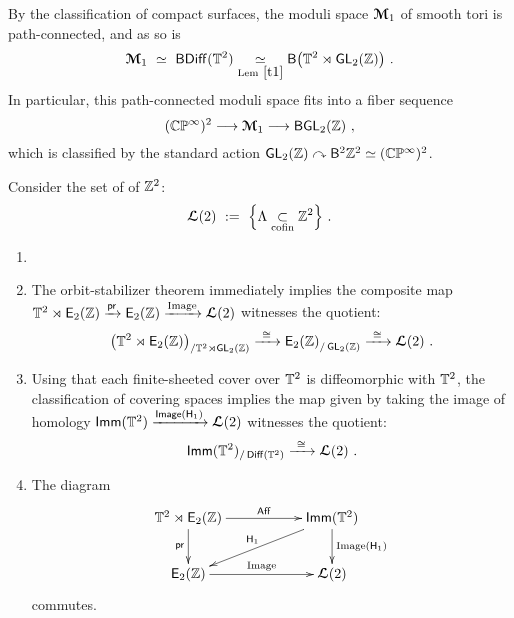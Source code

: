 \begin{remark}
\label{r10}
By the classification of compact surfaces, the moduli space $\boldsymbol{\mathcal M}_1$ of smooth tori is path-connected, and as so is 
\[
\boldsymbol{\mathcal M}_1
~\simeq~
{\sf BDiff}(\mathbb T^2)
\underset{\rm Lem~\ref{t1}}{~\simeq~}
\mathsf B\bigl(
\mathbb T^2 \rtimes \operatorname{\sf GL}_2(\mathbb Z)
\bigr)
~.
\]
In particular, this path-connected moduli space fits into a fiber sequence
\[
(\mathbb C\mathbb P^\infty)^2
\longrightarrow
\boldsymbol{\mathcal M}_1
\longrightarrow
{\sf BGL}_2(\mathbb Z)
~,
\]
which is classified by the standard action $\operatorname{\sf GL}_2(\mathbb Z) \curvearrowright \mathsf B^2 \mathbb Z^2 \simeq (\mathbb C\mathbb P^\infty)^2$.

\end{remark}





Consider the set of  of $\mathbb Z^2$:
\begin{equation*}
\boldsymbol{\mathcal L}(2) 
~:=~
\Bigl\{
\Lambda
\underset{\rm cofin}
\subset
\mathbb Z^2
\Bigr\}
~.
\end{equation*}
\begin{observation} \label{t99}

\begin{enumerate}

\item[~]

\item
The orbit-stabilizer theorem immediately implies the composite map 
$
\mathbb T^2 \rtimes \operatorname{\mathsf E_2(\mathbb Z)}
\xrightarrow{\operatorname{\mathsf{pr}}}
\operatorname{\mathsf E_2(\mathbb Z)}
\xrightarrow{\rm Image} 
\boldsymbol{\mathcal L}(2)
$
witnesses the quotient:
\[
\bigl(
\mathbb T^2 \rtimes \operatorname{\mathsf E_2(\mathbb Z)}
\bigr)_{/\mathbb T^2 \rtimes \operatorname{\sf GL}_2(\mathbb Z)}
\xrightarrow{~\cong~}
\operatorname{\mathsf E_2(\mathbb Z)}_{/\operatorname{\sf GL}_2(\mathbb Z)}
\xrightarrow{~\cong~}
\boldsymbol{\mathcal L}(2)
~.
\]


\item
Using that each finite-sheeted cover over $\mathbb T^2$ is diffeomorphic with $\mathbb T^2$, the classification of covering spaces implies the map given by taking the image of homology
$
\operatorname{\sf Imm}(\mathbb T^2)
\xrightarrow{{\sf Image}(\mathsf H_1)}
\boldsymbol{\mathcal L}(2)
$
witnesses the quotient:
\[
\operatorname{\sf Imm}(\mathbb T^2)_{/\operatorname{{\sf Diff}}(\mathbb T^2)}
\xrightarrow{~\cong~}
\boldsymbol{\mathcal L}(2)
~.
\]


\item
The diagram
\[
\xymatrix{
\TT^2 \rtimes \EZ 
\ar[rr]^-{\Aff}
\ar[d]_-{\pr}
&&
\Imm(\TT^2) 
\ar[d]^-{{\rm Image}(\sH_1)}
\ar[dll]_-{\sH_1}
\\
\EZ
\ar[rr]^-{\rm Image}
&&
\bcL(2)
}
\]
commutes.

\end{enumerate}


\end{observation}




